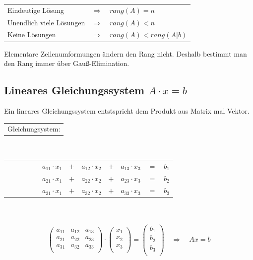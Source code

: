 \begin{tabular}{l c l}
	Eindeutige Lösung			& 	$\Longrightarrow$	&	$rang(A) = n$\\
	Unendlich viele Lösungen	&	$\Longrightarrow$	&	$rang(A) < n$\\
	Keine Lösungen				&	$\Longrightarrow$	&	$rang(A) < rang(A|b)$\\
\end{tabular}
\vspace{1em}

Elementare Zeilenumformungen ändern den Rang nicht.
Deshalb bestimmt man den Rang immer über Gauß-Elimination.


\subsection[Lineares Gleichungssystem]{Lineares Gleichungssystem $A \cdot x = b$}	

Ein lineares Gleichungssystem entstspricht dem Produkt aus Matrix mal Vektor.

\begin{tabular}{l}
	Gleichungsystem:
\end{tabular}\\
\begin{tabular}{lllll l l l l l l l}
	&&&&& $ a_{11} \cdot x_1$ & $+$ & $a_{12} \cdot x_2$ & $+$ & $a_{13} \cdot x_3$ & $=$ & $b_1$\\
	&&&&& $ a_{21} \cdot x_1$ & $+$ & $a_{22} \cdot x_2$ & $+$ & $a_{23} \cdot x_3$ & $=$ & $b_2$\\
	&&&&& $ a_{31} \cdot x_1$ & $+$ & $a_{32} \cdot x_2$ & $+$ & $a_{33} \cdot x_3$ & $=$ & $b_3$\\
\end{tabular}\\\\

\[
\begin{pmatrix}
		a_{11}	&	a_{12}	&	a_{13}\\
		a_{21}	&	a_{22}	&	a_{23}\\
		a_{31}	&	a_{32}	&	a_{33}\\
\end{pmatrix}
\cdot
\begin{pmatrix}
		x_1\\
		x_2\\
		x_3\\
\end{pmatrix}
=
\begin{pmatrix}
		b_1\\
		b_2\\
		b_3\\
\end{pmatrix}
\quad \Rightarrow \quad Ax=b
\]

